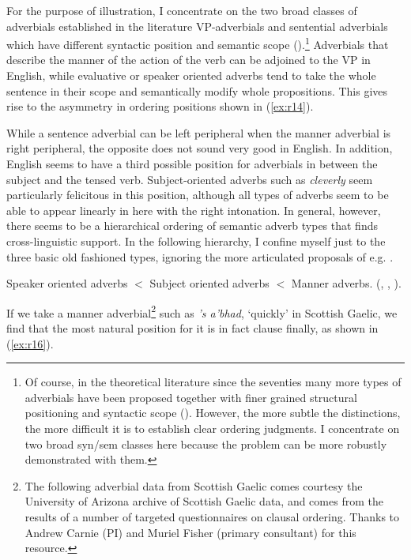 \documentclass[output=paper,colorlinks,citecolor=brown]{langscibook}
\begin{document}
For the purpose of illustration, I concentrate on the two broad classes of adverbials established in the literature VP-adverbials and sentential adverbials which have different syntactic position and semantic scope (\citealt{bellert77, jackendoff72}).\footnote{Of course, in the theoretical literature since the seventies many more types of adverbials have been proposed together with finer grained structural positioning and syntactic scope (\citealt{cinque99}). However, the more subtle the distinctions, the more difficult it is to establish clear ordering judgments. I concentrate on two broad syn/sem classes here because the problem can be more robustly demonstrated with them.}
Adverbials that describe the manner of the action of the verb can be adjoined to the VP in English, while evaluative or speaker oriented adverbs tend to take the whole sentence in their scope and semantically modify whole propositions. This gives rise to the asymmetry in ordering positions shown in (\ref{ex:r14}). 

\ea\label{ex:r14}
\z
\z

While a sentence adverbial can be left peripheral when the manner adverbial is right peripheral,  the opposite does not sound very good in English.   In addition, English seems to have a third possible position for adverbials in between the subject and the tensed verb. Subject-oriented adverbs such as \textit{cleverly} seem particularly felicitous in this position, although all types of adverbs seem to be able to appear linearly in here with the right intonation. In general, however, there seems to be a   hierarchical ordering of semantic adverb types  that finds cross\hyp linguistic support. In the following hierarchy, I confine myself just to the three basic old fashioned types, ignoring the more articulated proposals of e.g. \citet{cinque99}. 

\ea\label{ex:r15}
Speaker oriented adverbs $<$ Subject oriented adverbs $<$  Manner adverbs.
(\citealt{jackendoff72}, \citealt{alexiadou97},  \citealt{sportiche88}). 
\z

If we take a manner adverbial\footnote{The following adverbial data from Scottish Gaelic comes courtesy the University of Arizona archive of Scottish Gaelic data, and comes from the results of a number of targeted questionnaires on clausal ordering. Thanks to Andrew Carnie (PI) and Muriel Fisher (primary consultant) for this resource.} such as \textit{'s a'bhad}, `quickly' in Scottish Gaelic, we find that the most natural position for it is in fact clause finally, as shown in (\ref{ex:r16}).
\end{document}
